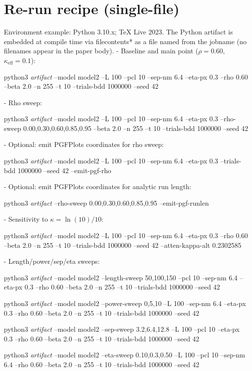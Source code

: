 \documentclass{article}
\newcommand{\cmd}[1]{\par\noindent\begingroup\scriptsize\ttfamily\raggedright\sloppy #1\par\endgroup}
\newcommand{\simL}{100}
\newcommand{\simpcl}{10}
\newcommand{\simsep}{6.4}
\newcommand{\simeta}{0.3}
\newcommand{\simn}{255}
\newcommand{\simt}{10}
\newcommand{\simtrials}{1000000}
\newcommand{\simseed}{42}
\newcommand{\simrhoB}{0.60}
\newcommand{\simrhoD}{0.00}
\newcommand{\simrhoA}{0.30}
\newcommand{\simrhoC}{0.85}
\newcommand{\simrhoE}{0.95}
\newcommand{\simkappaExact}{0.2302585}
\newcommand{\simLfa}{50}
\newcommand{\simLfb}{150}
\newcommand{\simpclA}{0}
\newcommand{\simpclB}{5}
\newcommand{\simpclC}{10}
\newcommand{\simsepA}{3.2}
\newcommand{\simsepB}{12.8}
\newcommand{\simetaA}{0.10}
\newcommand{\simetaB}{0.50}
\begin{document}
\section{Re-run recipe (single-file)}\label{sec:re-run}
Environment example: Python 3.10.x; TeX Live 2023. The Python artifact is embedded at compile time via filecontents* as a file named from the jobname (no filenames appear in the paper body).
- Baseline and main point (\(\rho=\simrhoB\), \(\kappa_{\mathrm{eff}}=0.1\)):
\cmd{python3 \emph{artifact} --model model2 --L \simL{} --pcl \simpcl{} --sep-nm \simsep{} --eta-px \simeta{} --rho \simrhoB{} --beta 2.0 --n \simn{} --t \simt{} --trials-bdd \simtrials{} --seed \simseed}
- Rho sweep:
\cmd{python3 \emph{artifact} --model model2 --L \simL{} --pcl \simpcl{} --sep-nm \simsep{} --eta-px \simeta{} --rho-sweep \simrhoD{},\simrhoA{},\simrhoB{},\simrhoC{},\simrhoE{} --beta 2.0 --n \simn{} --t \simt{} --trials-bdd \simtrials{} --seed \simseed}
- Optional: emit PGFPlots coordinates for rho sweep:
\cmd{python3 \emph{artifact} --model model2 --L \simL{} --pcl \simpcl{} --sep-nm \simsep{} --eta-px \simeta{} --trials-bdd \simtrials{} --seed \simseed{} --emit-pgf-rho}
- Optional: emit PGFPlots coordinates for analytic run length:
\cmd{python3 \emph{artifact} --rho-sweep \simrhoD{},\simrhoA{},\simrhoB{},\simrhoC{},\simrhoE{} --emit-pgf-runlen}
- Sensitivity to \(\kappa=\ln(10)/10\):
\cmd{python3 \emph{artifact} --model model2 --L \simL{} --pcl \simpcl{} --sep-nm \simsep{} --eta-px \simeta{} --rho \simrhoB{} --beta 2.0 --n \simn{} --t \simt{} --trials-bdd \simtrials{} --seed \simseed{} --atten-kappa-alt \simkappaExact}
- Length/power/sep/eta sweeps:
\cmd{python3 \emph{artifact} --model model2 --length-sweep \simLfa{},\simL{},\simLfb{} --pcl \simpcl{} --sep-nm \simsep{} --eta-px \simeta{} --rho \simrhoB{} --beta 2.0 --n \simn{} --t \simt{} --trials-bdd \simtrials{} --seed \simseed}
\cmd{python3 \emph{artifact} --model model2 --power-sweep \simpclA{},\simpclB{},\simpclC{} --L \simL{} --sep-nm \simsep{} --eta-px \simeta{} --rho \simrhoB{} --beta 2.0 --n \simn{} --t \simt{} --trials-bdd \simtrials{} --seed \simseed}
\cmd{python3 \emph{artifact} --model model2 --sep-sweep \simsepA{},\simsep{},\simsepB{} --L \simL{} --pcl \simpcl{} --eta-px \simeta{} --rho \simrhoB{} --beta 2.0 --n \simn{} --t \simt{} --trials-bdd \simtrials{} --seed \simseed}
\cmd{python3 \emph{artifact} --model model2 --eta-sweep \simetaA{},\simeta{},\simetaB{} --L \simL{} --pcl \simpcl{} --sep-nm \simsep{} --rho \simrhoB{} --beta 2.0 --n \simn{} --t \simt{} --trials-bdd \simtrials{} --seed \simseed}
\end{document}

